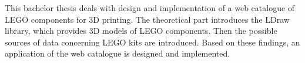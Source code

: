 This bachelor thesis deals with design and implementation of a web catalogue of LEGO components for 3D printing. The theoretical part introduces the LDraw library, which provides 3D models of LEGO components. Then the possible sources of data concerning LEGO kits are introduced. Based on these findings, an application of the web catalogue is designed and implemented.
